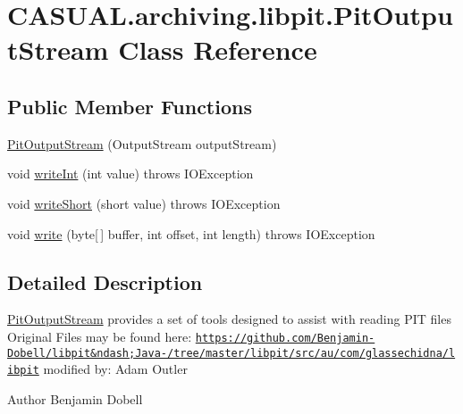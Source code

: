 \hypertarget{classCASUAL_1_1archiving_1_1libpit_1_1PitOutputStream}{\section{C\-A\-S\-U\-A\-L.\-archiving.\-libpit.\-Pit\-Output\-Stream Class Reference}
\label{classCASUAL_1_1archiving_1_1libpit_1_1PitOutputStream}
}
\subsection*{Public Member Functions}
\begin{DoxyCompactItemize}
\item 
\hyperlink{classCASUAL_1_1archiving_1_1libpit_1_1PitOutputStream_aa49dca8c904234bb8426f1d4171912b4}{Pit\-Output\-Stream} (Output\-Stream output\-Stream)
\item 
void \hyperlink{classCASUAL_1_1archiving_1_1libpit_1_1PitOutputStream_a43249fc4dc1170fe30b8e2417acb6c8a}{write\-Int} (int value)  throws I\-O\-Exception 
\item 
void \hyperlink{classCASUAL_1_1archiving_1_1libpit_1_1PitOutputStream_a1bb9dc0dd6dc712dad5a1c07093cee15}{write\-Short} (short value)  throws I\-O\-Exception 
\item 
void \hyperlink{classCASUAL_1_1archiving_1_1libpit_1_1PitOutputStream_aebcdfb1294537dd6a5f3268b7fea9940}{write} (byte\mbox{[}$\,$\mbox{]} buffer, int offset, int length)  throws I\-O\-Exception 
\end{DoxyCompactItemize}


\subsection{Detailed Description}
\hyperlink{classCASUAL_1_1archiving_1_1libpit_1_1PitOutputStream}{Pit\-Output\-Stream} provides a set of tools designed to assist with reading P\-I\-T files Original Files may be found here\-: \href{https://github.com/Benjamin-Dobell/libpit&ndash;Java-/tree/master/libpit/src/au/com/glassechidna/libpit}{\tt https\-://github.\-com/\-Benjamin-\/\-Dobell/libpit\&ndash;\-Java-\//tree/master/libpit/src/au/com/glassechidna/libpit} modified by\-: Adam Outler

\begin{DoxyAuthor}{Author}
Benjamin Dobell 
\end{DoxyAuthor}


